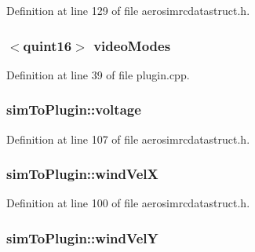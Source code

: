 Definition at line 129 of file aerosimrcdatastruct.\-h.

\hypertarget{group___aero_sim_r_c_ga56a26014d5fb746423472ca6301beff3}{
\subsubsection[{video\-Modes}]{$<$quint16$>$ video\-Modes}}\label{group___aero_sim_r_c_ga56a26014d5fb746423472ca6301beff3}


Definition at line 39 of file plugin.\-cpp.

\hypertarget{group___aero_sim_r_c_ga598e987b250d694aeaced9fb921e03bd}{
\subsubsection[{voltage}]{ sim\-To\-Plugin\-::voltage}}\label{group___aero_sim_r_c_ga598e987b250d694aeaced9fb921e03bd}


Definition at line 107 of file aerosimrcdatastruct.\-h.

\hypertarget{group___aero_sim_r_c_ga28ae11206edb7d479d61f42edfe59a6a}{
\subsubsection[{wind\-Vel\-X}]{ sim\-To\-Plugin\-::wind\-Vel\-X}}\label{group___aero_sim_r_c_ga28ae11206edb7d479d61f42edfe59a6a}


Definition at line 100 of file aerosimrcdatastruct.\-h.

\hypertarget{group___aero_sim_r_c_ga4a4ed34bd3c1e67d51b1d5b2272cbf3f}{
\subsubsection[{wind\-Vel\-Y}]{ sim\-To\-Plugin\-::wind\-Vel\-Y}}\label{group___aero_sim_r_c_ga4a4ed34bd3c1e67d51b1d5b2272cbf3f}


